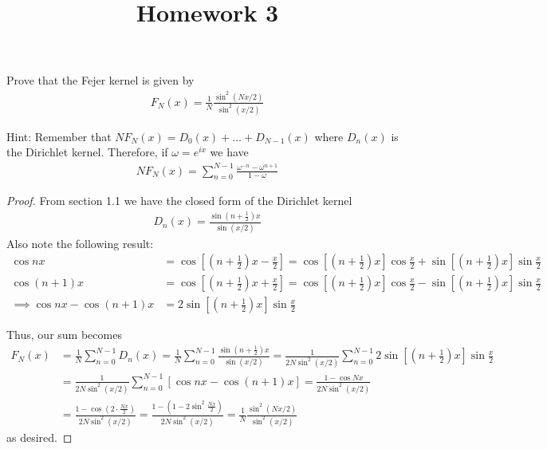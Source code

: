 \documentclass{article}
\begin{document}
\title{Homework 3}
\maketitle
\thispagestyle{fancy}

\begin{enumerate}
  \ii Prove that the Fejer kernel is given by
  \begin{align*}
    F_N(x) = \frac{1}{N} \frac{\sin^2(Nx/2)}{\sin^2(x/2)}
  \end{align*}
  
  Hint: Remember that $NF_N(x) = D_0(x)+\dots+D_{N-1}(x)$ where $D_n(x)$ is the Dirichlet kernel. Therefore, if $\omega=e^{ix}$ we have
  \begin{align*}
    NF_N(x) = \sum_{n=0}^{N-1}\frac{\omega^{-n}-\omega^{n+1}}{1-\omega}
  \end{align*}
  \begin{proof}
    From section 1.1 we have the closed form of the Dirichlet kernel
    \begin{align*}
      D_n(x) = \frac{\sin \left( n+\frac{1}{2} \right)x}{\sin(x/2)}
    \end{align*}
    Also note the following result:
    \begin{align*}
      \cos nx &= \cos\left[ \left( n+\frac{1}{2} \right)x - \frac{x}{2} \right] = \cos \left[\left( n+ \frac{1}{2}\right)x\right] \cos \frac{x}{2} + \sin \left[ \left( n+\frac{1}{2} \right)x \right]\sin \frac{x}{2} \\
      \cos (n+1)x &= \cos\left[ \left( n+\frac{1}{2} \right)x + \frac{x}{2} \right] = \cos\left[ \left( n+\frac{1}{2} \right)x \right] \cos \frac{x}{2} - \sin\left[ \left( n+\frac{1}{2} \right)x \right]\sin \frac{x}{2} \\
      \implies \cos nx - \cos (n+1)x &= 2\sin \left[ \left( n+\frac{1}{2} \right)x \right]\sin \frac{x}{2}
    \end{align*}

    Thus, our sum becomes
    \begin{align*}
      F_N(x) &= \frac{1}{N} \sum_{n=0}^{N-1} D_n(x) = \frac{1}{N} \sum_{n=0}^{N-1} \frac{\sin \left(n+\frac{1}{2}\right)x}{\sin (x/2)} = \frac{1}{2N\sin^2(x/2)} \sum_{n=0}^{N-1} 2\sin\left[ \left( n+\frac{1}{2} \right)x \right]\sin \frac{x}{2} \\
      &= \frac{1}{2N\sin^2 (x/2)} \sum_{n=0}^{N-1} \left[ \cos nx - \cos (n+1)x \right] = \frac{1-\cos Nx}{2N\sin^2(x/2)} \\
      &= \frac{1-\cos \left( 2\cdot \frac{Nx}{2} \right)}{2N\sin^2(x/2)} = \frac{1-\left(1- 2\sin^2 \frac{Nx}{2} \right)}{2N\sin^2(x/2)} = \frac{1}{N} \frac{\sin^2 (Nx/2)}{\sin^2(x/2)}
    \end{align*}
    as desired.
  \end{proof}


\end{enumerate}
\end{document}
